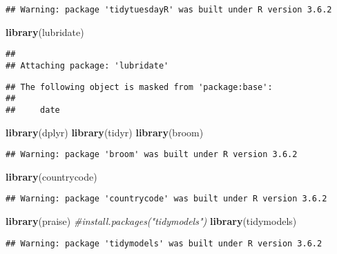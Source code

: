 \documentclass[]{article}
\newenvironment{Shaded}{\begin{snugshade}}{\end{snugshade}}
\newcommand{\CommentTok}[1]{\textcolor[rgb]{0.56,0.35,0.01}{\textit{#1}}}
\newcommand{\KeywordTok}[1]{\textcolor[rgb]{0.13,0.29,0.53}{\textbf{#1}}}
\newcommand{\NormalTok}[1]{#1}
\begin{document}
\begin{verbatim}
## Warning: package 'tidytuesdayR' was built under R version 3.6.2
\end{verbatim}

\begin{Shaded}
\begin{Highlighting}[]
\KeywordTok{library}\NormalTok{(lubridate)}
\end{Highlighting}
\end{Shaded}

\begin{verbatim}
## 
## Attaching package: 'lubridate'
\end{verbatim}

\begin{verbatim}
## The following object is masked from 'package:base':
## 
##     date
\end{verbatim}

\begin{Shaded}
\begin{Highlighting}[]
\KeywordTok{library}\NormalTok{(dplyr)}
\KeywordTok{library}\NormalTok{(tidyr)}
\KeywordTok{library}\NormalTok{(broom)}
\end{Highlighting}
\end{Shaded}

\begin{verbatim}
## Warning: package 'broom' was built under R version 3.6.2
\end{verbatim}

\begin{Shaded}
\begin{Highlighting}[]
\KeywordTok{library}\NormalTok{(countrycode)}
\end{Highlighting}
\end{Shaded}

\begin{verbatim}
## Warning: package 'countrycode' was built under R version 3.6.2
\end{verbatim}

\begin{Shaded}
\begin{Highlighting}[]
\KeywordTok{library}\NormalTok{(praise)}
\CommentTok{#install.packages("tidymodels")}
\KeywordTok{library}\NormalTok{(tidymodels)}
\end{Highlighting}
\end{Shaded}

\begin{verbatim}
## Warning: package 'tidymodels' was built under R version 3.6.2
\end{verbatim}
\end{document}
